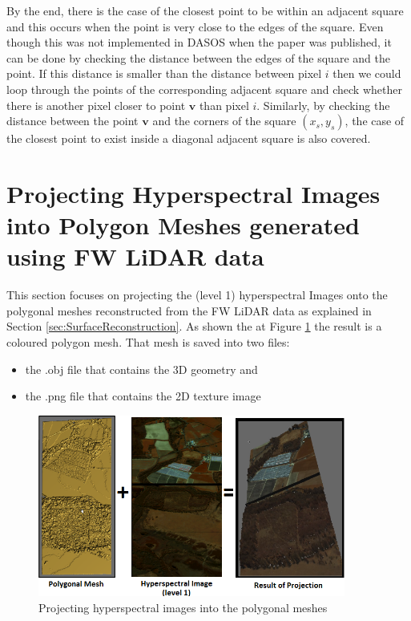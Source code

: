 \documentclass{subfiles}
\begin{document}
	\par By the end, there is the case of the closest point to be within an adjacent square and this occurs when the point is very close to the edges of the square. Even though this was not implemented in DASOS when the paper \cite{Miltiadou2015} was published, it can be done by checking the distance between the edges of the square and the point. If this distance is smaller than the distance between pixel $i$ then we could loop through the points of the corresponding adjacent square and check whether there is another pixel closer to point $\mathbf{v}$ than pixel $i$. Similarly, by checking the distance between the point $\mathbf{v}$ and the corners of the square $(x_s,y_s)$, the case of the closest point to exist inside a diagonal adjacent square is also covered. 
	
		
\section{Projecting Hyperspectral Images into Polygon Meshes generated using FW LiDAR data}\label{sec:ProjectingHyperspectral}
	\par This section focuses on projecting the (level 1) hyperspectral Images onto the polygonal meshes reconstructed from the FW LiDAR data as explained in Section \ref{sec:SurfaceReconstruction}. As shown the at Figure \ref{fig:ProjectingHyperspectral} the result is a coloured polygon mesh. That mesh is saved into two files: 
	 \begin{itemize}
	 	\item the .obj file that contains the 3D geometry and
	 	\item the .png file that contains the 2D texture image
	 \end{itemize} 	

	
		 \begin{figure} [h!]
		 	\centering
		 	\includegraphics[width=0.9\textwidth]{img/ProjectingHyperspectral}
		 	\caption{Projecting hyperspectral images into the polygonal meshes}
		 	\label{fig:ProjectingHyperspectral}
		 \end{figure}
		 
\end{document}
